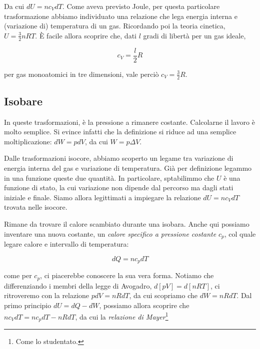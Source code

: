 \noindent Da cui $dU = nc_VdT$. Come aveva previsto Joule, per questa
particolare trasformazione abbiamo individuato una relazione che lega
energia interna e (variazione di) temperatura di un gas. Ricordando
poi la teoria cinetica, $U = \frac32 nRT$. È facile allora scoprire
che, dati $l$ gradi di libertà per un gas ideale,

\[ c_V = \frac{l}{2}R \]

\noindent per gas monoatomici in tre dimensioni, vale perciò $c_V = \frac32 R$.


\subsection{Isobare}
In queste trasformazioni, è la pressione a rimanere costante.
Calcolarne il lavoro è molto semplice. Si evince infatti che
la definizione si riduce ad una semplice moltiplicazione:
$dW = pdV$, da cui $W = p\Delta V$.

Dalle trasformazioni isocore, abbiamo scoperto un legame tra
variazione di energia interna del gas e variazione di temperatura.
Già per definizione legammo in una funzione queste due quantità.
In particolare, sptabilimmo che $U$ è una funzione di stato, la
cui variazione non dipende dal percorso ma dagli stati iniziale
e finale. Siamo allora legittimati a impiegare la relazione
$dU = nc_VdT$ trovata nelle isocore.

Rimane da trovare il calore scambiato durante una isobara. Anche
qui possiamo inventare una nuova costante, un \textit{calore specifico
a pressione costante} $c_p$, col quale legare calore e intervallo
di temperatura:

\[ dQ = nc_pdT \]

\noindent come per $c_p$, ci piacerebbe conoscere la sua vera forma.
Notiamo che differenziando i membri della legge di Avogadro,
$d[pV] = d[nRT]$, ci ritroveremo con la relazione $pdV = nRdT$,
da cui scopriamo che $dW = nRdT$. Dal primo principio $dU = dQ - dW$,
possiamo allora scoprire che $nc_VdT = nc_pdT - nRdT$, da cui
la \textit{relazione di Mayer}\footnote{Come lo studentato.}

